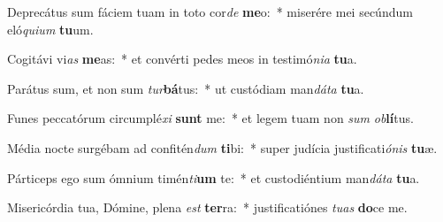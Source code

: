 \item Deprecátus sum fáciem tuam in toto cor\textit{de} \textbf{me}o:~* miserére mei secúndum eló\textit{qui}\textit{um} \textbf{tu}um.
\item Cogitávi vi\textit{as} \textbf{me}as:~* et convérti pedes meos in testimó\textit{ni}\textit{a} \textbf{tu}a.
\item Parátus sum, et non sum \textit{tur}\textbf{bá}tus:~* ut custódiam man\textit{dá}\textit{ta} \textbf{tu}a.
\item Funes peccatórum circumplé\textit{xi} \textbf{sunt} me:~* et legem tuam non \textit{sum} \textit{ob}\textbf{lí}tus.
\item Média nocte surgébam ad confitén\textit{dum} \textbf{ti}bi:~* super judícia justificati\textit{ó}\textit{nis} \textbf{tu}æ.
\item Párticeps ego sum ómnium timén\textit{ti}\textbf{um} te:~* et custodiéntium man\textit{dá}\textit{ta} \textbf{tu}a.
\item Misericórdia tua, Dómine, plena \textit{est} \textbf{ter}ra:~* justificatiónes \textit{tu}\textit{as} \textbf{do}ce me.
